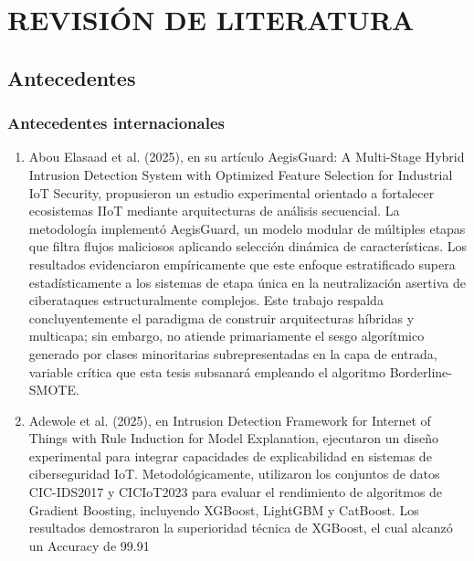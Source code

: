 \chapter{REVISIÓN DE LITERATURA}

\section{Antecedentes}

\subsection{Antecedentes internacionales}
\begin{enumerate}

\item Abou Elasaad et al. (2025), en su artículo AegisGuard: A Multi-Stage Hybrid Intrusion Detection System with Optimized Feature Selection for Industrial IoT Security, propusieron un estudio experimental orientado a fortalecer ecosistemas IIoT mediante arquitecturas de análisis secuencial. La metodología implementó AegisGuard, un modelo modular de múltiples etapas que filtra flujos maliciosos aplicando selección dinámica de características. Los resultados evidenciaron empíricamente que este enfoque estratificado supera estadísticamente a los sistemas de etapa única en la neutralización asertiva de ciberataques estructuralmente complejos. Este trabajo respalda concluyentemente el paradigma de construir arquitecturas híbridas y multicapa; sin embargo, no atiende primariamente el sesgo algorítmico generado por clases minoritarias subrepresentadas en la capa de entrada, variable crítica que esta tesis subsanará empleando el algoritmo Borderline-SMOTE.

\item Adewole et al. (2025), en Intrusion Detection Framework for Internet of Things with Rule Induction for Model Explanation, ejecutaron un diseño experimental para integrar capacidades de explicabilidad en sistemas de ciberseguridad IoT. Metodológicamente, utilizaron los conjuntos de datos CIC-IDS2017 y CICIoT2023 para evaluar el rendimiento de algoritmos de Gradient Boosting, incluyendo XGBoost, LightGBM y CatBoost. Los resultados demostraron la superioridad técnica de XGBoost, el cual alcanzó un Accuracy de 99.91%


\end{enumerate}

